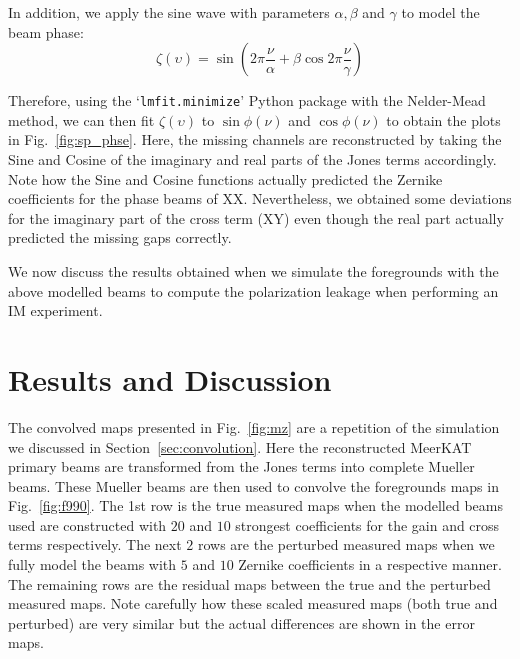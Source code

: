 \noindent In addition, we apply the sine wave with parameters $\alpha, \beta$ and $\gamma$ to model the beam phase:
 \begin{equation}\label{eq:phs}
  \zeta(\upsilon) = \sin(2\pi \frac{\nu}{\alpha} + \beta \cos 2\pi \frac{\nu}{\gamma}) 
 \end{equation}

 \noindent Therefore, using the \enquote*{\tt lmfit.minimize} Python package with the Nelder-Mead method,  we can then 
 fit $\zeta(\upsilon)$ to $\sin \phi(\nu)$ and $\cos \phi(\nu)$ to obtain the plots in Fig.~\ref{fig:sp_phse}. Here, the missing channels are reconstructed by taking  the Sine and Cosine of the imaginary and real parts of the Jones terms accordingly. Note how the Sine and Cosine functions actually predicted the Zernike coefficients for the  phase beams of XX. Nevertheless, we obtained some deviations for the imaginary part of the cross term (XY) even though the real part actually predicted the missing gaps correctly.  

We now discuss the results obtained when we simulate the foregrounds with the above modelled beams to compute  the polarization leakage when performing an IM experiment.
% 

\section{Results and Discussion}	   \label{chap5:RnD}

 The convolved maps presented in Fig.~\ref{fig:mz} are a repetition of the simulation we discussed in Section~\ref{sec:convolution}.  Here the reconstructed MeerKAT primary beams are transformed from the Jones terms into complete Mueller beams. These Mueller beams are then used to convolve the foregrounds maps  in Fig.~\ref{fig:f990}. The 1st row is the true measured maps when the modelled beams used are constructed with $20$ and $10$ strongest coefficients for the  gain and cross terms respectively. The next $2$ rows are the perturbed measured maps  when we fully model the beams with $5$ and $10$ Zernike coefficients in a respective manner. The remaining rows are the residual maps between the true and the perturbed  measured maps. Note carefully how these scaled measured maps (both true and perturbed) are very similar but the actual differences are shown in the error maps.
 
